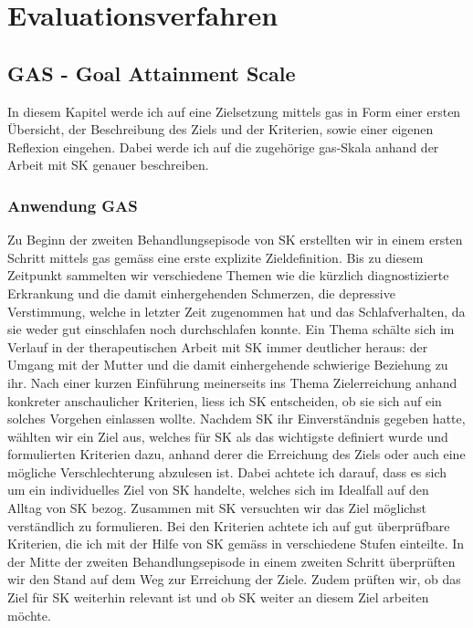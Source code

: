 \section{Evaluations\-verfahren}\label{sec:Evaluationsverfahren}

\subsection{GAS - Goal Attainment Scale}
In diesem Kapitel werde ich auf eine Zielsetzung mittels \acf{gas} in Form einer ersten Übersicht, der Beschreibung des Ziels und der Kriterien, sowie einer eigenen Reflexion eingehen. Dabei werde ich auf die zugehörige \ac{gas}-Skala anhand der Arbeit mit SK genauer beschreiben. 

\subsubsection{Anwendung GAS}
Zu Beginn der zweiten Behandlungsepisode von SK erstellten wir in einem ersten Schritt mittels \ac{gas} gemäss  eine erste explizite Zieldefinition. Bis zu diesem Zeitpunkt sammelten wir verschiedene Themen wie die kürzlich diagnostizierte Erkrankung und die damit einhergehenden Schmerzen, die depressive Verstimmung, welche in letzter Zeit zugenommen hat und das Schlafverhalten, da sie weder gut einschlafen noch durchschlafen konnte. Ein Thema schälte sich im Verlauf in der therapeutischen Arbeit mit SK immer deutlicher heraus: der Umgang mit der Mutter und die damit einhergehende schwierige Beziehung zu ihr. Nach einer kurzen Einführung meinerseits ins Thema Zielerreichung anhand konkreter anschaulicher Kriterien, liess ich SK entscheiden, ob sie sich auf ein solches Vorgehen einlassen wollte. Nachdem SK ihr Einverständnis gegeben hatte, wählten wir ein Ziel aus, welches für SK als das wichtigste definiert wurde und formulierten Kriterien dazu, anhand derer die Erreichung des Ziels oder auch eine mögliche Verschlechterung abzulesen ist. Dabei achtete ich darauf, dass es sich um ein individuelles Ziel von SK handelte, welches sich im Idealfall auf den Alltag von SK bezog. Zusammen mit SK versuchten wir das Ziel möglichst verständlich zu formulieren. Bei den Kriterien achtete ich auf gut überprüfbare Kriterien, die ich mit der Hilfe von SK gemäss  in verschiedene Stufen einteilte. In der Mitte der zweiten Behandlungsepisode in einem zweiten Schritt überprüften wir den Stand auf dem Weg zur Erreichung der Ziele. Zudem prüften wir, ob das Ziel für SK weiterhin relevant ist und ob SK weiter an diesem Ziel arbeiten möchte.

